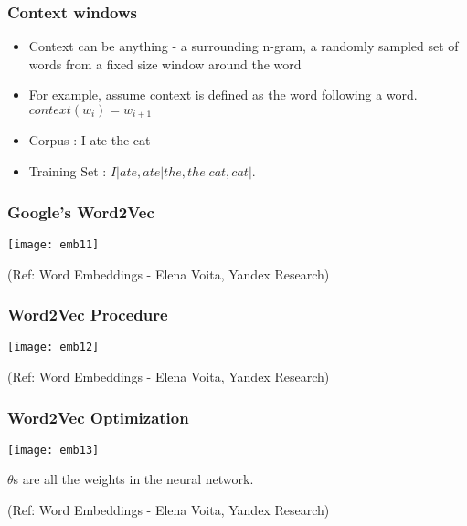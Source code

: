 \begin{frame}[fragile]\frametitle{Context windows}
\begin{itemize}
\item Context can be anything - a surrounding n-gram, a randomly sampled set of words from a fixed size window around the word
\item For example, assume context is defined as the word following a word. $context(w_i) = w_{i+1}$
\item Corpus :  I ate the cat
\item Training Set  : $I|ate,  ate|the ,  the|cat, cat|. $
\end{itemize}
\end{frame}


\begin{frame}[fragile]\frametitle{Google's Word2Vec}
\begin{center}
\texttt{[image: emb11]}
\end{center}

{\tiny (Ref: Word Embeddings - Elena Voita, Yandex Research)}
\end{frame}

\begin{frame}[fragile]\frametitle{Word2Vec Procedure}
\begin{center}
\texttt{[image: emb12]}
\end{center}

{\tiny (Ref: Word Embeddings - Elena Voita, Yandex Research)}
\end{frame}

\begin{frame}[fragile]\frametitle{Word2Vec Optimization}
\begin{center}
\texttt{[image: emb13]}
\end{center}

$\theta$s are all the weights in the neural network.

{\tiny (Ref: Word Embeddings - Elena Voita, Yandex Research)}
\end{frame}




